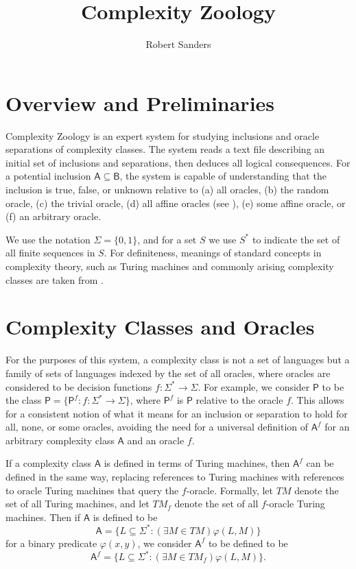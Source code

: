 \documentclass[12pt]{article}
\title{Complexity Zoology}
\author{Robert Sanders}
\theoremstyle{definition}
\theoremstyle{remark}
\newcommand{\ra}{\rightarrow}
\newcommand{\A}{\mathsf{A}}
\newcommand{\sP}{\mathsf{P}}
\newcommand{\msf}[1]{\mathsf{#1}}
\begin{document}
\maketitle

\section{Overview and Preliminaries}

Complexity Zoology is an expert system for studying inclusions and oracle
separations of complexity classes. The system reads a text file describing an
initial set of inclusions and separations, then deduces all logical
consequences. For a potential inclusion $\msf{A}\subseteq\msf{B}$, the system is
capable of understanding that the inclusion is true, false, or unknown relative
to (a) all oracles, (b) the random oracle, (c) the trivial oracle, (d) all
affine oracles (see \cite{aydinlioglu2018affine}), (e) some affine oracle, or
(f) an arbitrary oracle.

We use the notation $\Sigma=\{0,1\}$, and for a set $S$ we use $S^*$ to indicate
the set of all finite sequences in $S$. For definiteness, meanings of standard
concepts in complexity theory, such as Turing machines and commonly arising
complexity classes are taken from \cite{arora2009computational}.

\section{Complexity Classes and Oracles}

For the purposes of this system, a complexity class is not a set of languages
but a family of sets of languages indexed by the set of all oracles, where
oracles are considered to be decision functions $f:\Sigma^*\ra\Sigma$. For
example, we consider $\sP$ to be the class
$\sP=\{\sP^f:f:\Sigma^*\ra\Sigma\}$,
where $\sP^f$ is $\sP$ relative to the oracle $f$. This allows for a
consistent notion of what it means for an inclusion or separation to hold for
all, none, or some oracles, avoiding the need for a universal definition of
$\A^f$ for an arbitrary complexity class $\A$ and an oracle $f$.

If a complexity class $\A$ is defined in terms of Turing machines, then $\A^f$
can be defined in the same way, replacing references to Turing machines with
references to oracle Turing machines that query the $f$-oracle. Formally, let
$TM$ denote the set of all Turing machines, and let $TM_f$ denote the set of all
$f$-oracle Turing machines. Then if $\A$ is defined to be
\[
\A=\{L\subseteq\Sigma^*:(\exists M\in TM)\varphi(L,M)\}
\]
for a binary predicate $\varphi(x,y)$, we consider $\A^f$ to be defined to be
\[
\A^f=\{L\subseteq\Sigma^*:(\exists M\in TM_f)\varphi(L,M)\}.
\]
\end{document}
